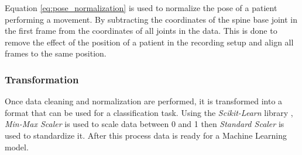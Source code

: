         Equation \ref{eq:pose_normalization} is used to normalize the pose of a patient performing a movement. By subtracting the coordinates of the spine base joint in the first frame from the coordinates of all joints in the data. This is done to remove the effect of the position of a patient in the recording setup and align all frames to the same position. 

        \subsubsection{Transformation}

        Once data cleaning and normalization are performed, it is transformed into a format that can be used for a classification task. Using the \textit{Scikit-Learn} library \cite{sklearn_api}, \textit{Min-Max Scaler} is used to scale data between 0 and 1 then \textit{Standard Scaler} is used to standardize it. After this process data is ready for a Machine Learning model.

\cleardoublepage